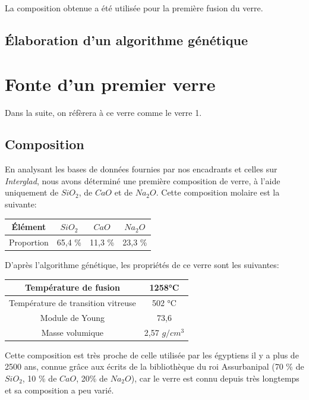 \documentclass{article}
\begin{document}
La composition obtenue a été utilisée pour la première fusion du verre.

\subsection{\'Elaboration d'un algorithme génétique}

\section{Fonte d'un premier verre}

Dans la suite, on réfèrera à ce verre comme le verre 1.
\subsection{Composition}

En analysant les bases de données fournies par nos encadrants et celles sur \textit{Interglad}, nous avons déterminé une première composition de verre, à l'aide uniquement de $SiO_2$, de $CaO$ et de $Na_2O$. Cette composition molaire est la suivante:

\begin{table}[h]
\centering
\begin{tabular}{|c|c|c|c|}
    \hline
    \'Elément &  $SiO_2$ & $CaO$ & $Na_2O$ \\
    \hline
    Proportion & 65,4 \% & 11,3 \% & 23,3 \% \\
    \hline
    \end{tabular} 
\end{table}

D'après l'algorithme génétique, les propriétés de ce verre sont les suivantes:

\begin{table}[h]
\centering
\begin{tabular}{|c|c|}
    \hline
    Température de fusion & 1258°C \\
    \hline
    Température de transition vitreuse & 502 °C \\
    \hline
    Module de Young & 73,6 \\
    \hline
    Masse volumique & 2,57 $g/cm^{3}$ \\
    \hline
    \end{tabular}
\end{table}

Cette composition est très proche de celle utilisée par les égyptiens il y a plus de 2500 ans, connue grâce aux écrits de la bibliothèque du roi Assurbanipal (70 \% de $SiO_2$, 10 \% de $CaO$, 20\% de $Na_2O$), car le verre est connu depuis très longtemps et sa composition a peu varié. 
\end{document}
